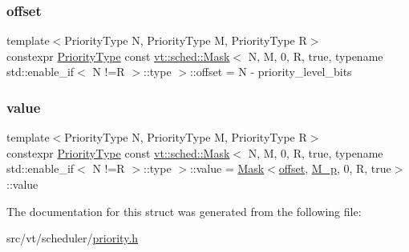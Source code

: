 \subsubsection{\texorpdfstring{offset}{offset}}
{\footnotesize\ttfamily template$<$Priority\+Type N, Priority\+Type M, Priority\+Type R$>$ \\
constexpr \hyperlink{namespacevt_a86bff9f556eb761b27fc8600d006ac04}{Priority\+Type} const \hyperlink{structvt_1_1sched_1_1_mask}{vt\+::sched\+::\+Mask}$<$ N, M, 0, R, true, typename std\+::enable\+\_\+if$<$ N !=R $>$\+::type $>$\+::offset = N -\/ priority\+\_\+level\+\_\+bits\hspace{0.3cm}{\ttfamily [static]}}

\mbox{\label{structvt_1_1sched_1_1_mask_3_01_n_00_01_m_00_010_00_01_r_00_01true_00_01typename_01std_1_1enable84a8b0b373fb69b0fca50672234c2a86_a9b04f95f8b193e0b8f6e09ad2e580c4a}} 
\subsubsection{\texorpdfstring{value}{value}}
{\footnotesize\ttfamily template$<$Priority\+Type N, Priority\+Type M, Priority\+Type R$>$ \\
constexpr \hyperlink{namespacevt_a86bff9f556eb761b27fc8600d006ac04}{Priority\+Type} const \hyperlink{structvt_1_1sched_1_1_mask}{vt\+::sched\+::\+Mask}$<$ N, M, 0, R, true, typename std\+::enable\+\_\+if$<$ N !=R $>$\+::type $>$\+::value = \hyperlink{structvt_1_1sched_1_1_mask}{Mask}$<$\hyperlink{structvt_1_1sched_1_1_mask_3_01_n_00_01_m_00_010_00_01_r_00_01true_00_01typename_01std_1_1enable84a8b0b373fb69b0fca50672234c2a86_a135ff903440365afaf87ffb49e822820}{offset}, \hyperlink{structvt_1_1sched_1_1_mask_3_01_n_00_01_m_00_010_00_01_r_00_01true_00_01typename_01std_1_1enable84a8b0b373fb69b0fca50672234c2a86_ac7b7308185e80b997833fc8575384ea0}{M\+\_\+p}, 0, R, true$>$\+::value\hspace{0.3cm}{\ttfamily [static]}}



The documentation for this struct was generated from the following file\+:\begin{DoxyCompactItemize}
\item 
src/vt/scheduler/\hyperlink{priority_8h}{priority.\+h}\end{DoxyCompactItemize}
